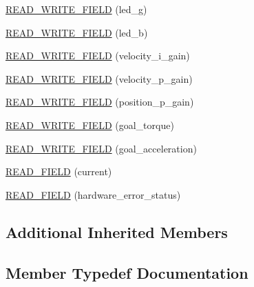 \begin{DoxyCompactItemize}
\item 
\hyperlink{classdynamixel_1_1servos_1_1_pro_l4210_s300_aeec76cbdf824d96172ac8812a8d1780e}{R\+E\+A\+D\+\_\+\+W\+R\+I\+T\+E\+\_\+\+F\+I\+E\+L\+D} (led\+\_\+g)
\item 
\hyperlink{classdynamixel_1_1servos_1_1_pro_l4210_s300_a0aa08ab4ec4a5cac2a5eac3330895e38}{R\+E\+A\+D\+\_\+\+W\+R\+I\+T\+E\+\_\+\+F\+I\+E\+L\+D} (led\+\_\+b)
\item 
\hyperlink{classdynamixel_1_1servos_1_1_pro_l4210_s300_a2f3e87529061a36b80f346f92e19807b}{R\+E\+A\+D\+\_\+\+W\+R\+I\+T\+E\+\_\+\+F\+I\+E\+L\+D} (velocity\+\_\+i\+\_\+gain)
\item 
\hyperlink{classdynamixel_1_1servos_1_1_pro_l4210_s300_a4921ecd90be710332856fa76f4a4f8e5}{R\+E\+A\+D\+\_\+\+W\+R\+I\+T\+E\+\_\+\+F\+I\+E\+L\+D} (velocity\+\_\+p\+\_\+gain)
\item 
\hyperlink{classdynamixel_1_1servos_1_1_pro_l4210_s300_a203f1c9374541432e33e367002cec23b}{R\+E\+A\+D\+\_\+\+W\+R\+I\+T\+E\+\_\+\+F\+I\+E\+L\+D} (position\+\_\+p\+\_\+gain)
\item 
\hyperlink{classdynamixel_1_1servos_1_1_pro_l4210_s300_a5a0a0a36eb996f9e77708ca181455fe9}{R\+E\+A\+D\+\_\+\+W\+R\+I\+T\+E\+\_\+\+F\+I\+E\+L\+D} (goal\+\_\+torque)
\item 
\hyperlink{classdynamixel_1_1servos_1_1_pro_l4210_s300_a94e3f934c7a11adafb592c1854219d49}{R\+E\+A\+D\+\_\+\+W\+R\+I\+T\+E\+\_\+\+F\+I\+E\+L\+D} (goal\+\_\+acceleration)
\item 
\hyperlink{classdynamixel_1_1servos_1_1_pro_l4210_s300_a73d43171e4cf0e30d0657028a30c61cd}{R\+E\+A\+D\+\_\+\+F\+I\+E\+L\+D} (current)
\item 
\hyperlink{classdynamixel_1_1servos_1_1_pro_l4210_s300_ab640fe2d0438c252b62cefc7fe4f1e33}{R\+E\+A\+D\+\_\+\+F\+I\+E\+L\+D} (hardware\+\_\+error\+\_\+status)
\end{DoxyCompactItemize}
\subsection*{Additional Inherited Members}


\subsection{Member Typedef Documentation}
\hypertarget{classdynamixel_1_1servos_1_1_pro_l4210_s300_a1b4b259aea6c0b456ca339f0268ec843}{}
